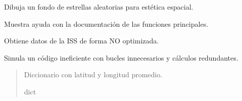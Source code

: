\documentclass[letterpaper,10pt,spanish]{sphinxmanual}
\begin{document}
\begin{fulllineitems}
\begin{fulllineitems}
\label{\detokenize{main:main.App.dibujar_estrellas}}
\pysigstartsignatures
\pysiglinewithargsret
{}
{}
{}
\pysigstopsignatures
\sphinxAtStartPar
Dibuja un fondo de estrellas aleatorias para estética espacial.

\end{fulllineitems}


\begin{fulllineitems}
\label{\detokenize{main:main.App.mostrar_help}}
\pysigstartsignatures
\pysiglinewithargsret
{}
{}
{}
\pysigstopsignatures
\sphinxAtStartPar
Muestra ayuda con la documentación de las funciones principales.

\end{fulllineitems}


\end{fulllineitems}


\begin{fulllineitems}
\label{\detokenize{main:main.obtener_datos_no_opt}}
\pysigstartsignatures
\pysiglinewithargsret
{}
{}
{}
\pysigstopsignatures
\sphinxAtStartPar
Obtiene datos de la ISS de forma NO optimizada.

\sphinxAtStartPar
Simula un código ineficiente con bucles innecesarios y cálculos redundantes.
\begin{quote}\begin{description}
\sphinxAtStartPar
Diccionario con latitud y longitud promedio.

\sphinxAtStartPar
dict

\end{description}\end{quote}

\end{fulllineitems}

\end{document}
